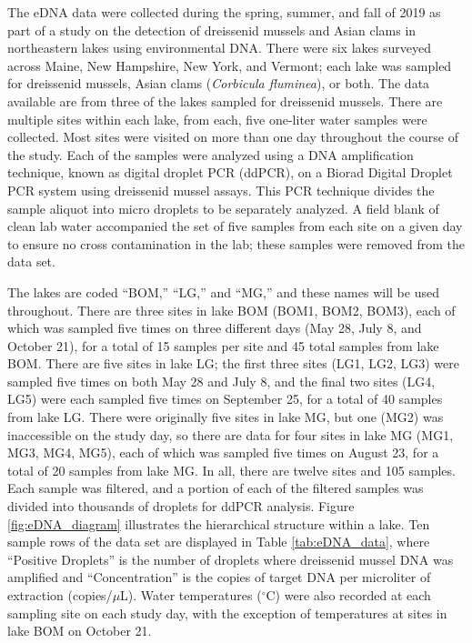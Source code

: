 \documentclass[12pt]{article}\usepackage[]{graphicx}\usepackage[]{color}
\begin{document}
The eDNA data were collected during the spring, summer, and fall of 2019 as part of a study on the detection of dreissenid mussels and Asian clams in northeastern lakes using environmental DNA. There were six lakes surveyed across Maine, New Hampshire, New York, and Vermont; each lake was sampled for dreissenid mussels, Asian clams (\textit{Corbicula fluminea}), or both. The data available are from three of the lakes sampled for dreissenid mussels. There are multiple sites within each lake, from each, five one-liter water samples were collected. Most sites were visited on more than one day throughout the course of the study. Each of the samples were analyzed using a DNA amplification technique, known as digital droplet PCR (ddPCR), on a Biorad Digital Droplet PCR system using dreissenid mussel assays. This PCR technique divides the sample aliquot into micro droplets to be separately analyzed. A field blank of clean lab water accompanied the set of five samples from each site on a given day to ensure no cross contamination in the lab; these samples were removed from the data set. 

The lakes are coded ``BOM,'' ``LG,'' and ``MG,'' and these names will be used throughout. There are three sites in lake BOM (BOM1, BOM2, BOM3), each of which was sampled five times on three different days (May 28, July 8, and October 21), for a total of 15 samples per site and 45 total samples from lake BOM. There are five sites in lake LG; the first three sites (LG1, LG2, LG3) were sampled five times on both May 28 and July 8, and the final two sites (LG4, LG5) were each sampled five times on September 25, for a total of 40 samples from lake LG. There were originally five sites in lake MG, but one (MG2) was inaccessible on the study day, so there are data for four sites in lake MG (MG1, MG3, MG4, MG5), each of which was sampled five times on August 23, for a total of 20 samples from lake MG. In all, there are twelve sites and 105 samples. Each sample was filtered, and a portion of each of the filtered samples was divided into thousands of droplets for ddPCR analysis. Figure \ref{fig:eDNA_diagram} illustrates the hierarchical structure within a lake. Ten sample rows of the data set are displayed in Table \ref{tab:eDNA_data}, where ``Positive Droplets'' is the number of droplets where dreissenid mussel DNA was amplified and ``Concentration'' is the copies of target DNA per microliter of extraction (copies/$\mu$L). Water temperatures ($^\circ$C) were also recorded at each sampling site on each study day, with the exception of temperatures at sites in lake BOM on October 21. 
\end{document}
